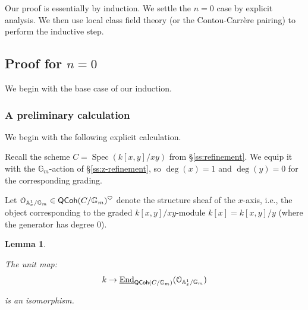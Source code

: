 \documentclass[reqno,11pt]{amsart}
\numberwithin{equation}{subsection}
\newtheorem{lem}[thm]{Lemma}
\theoremstyle{remark}
\newcommand{\bA}{{\mathbb A}}
\newcommand{\bG}{{\mathbb G}}
\newcommand{\sO}{{\EuScript O}}
\newcommand{\on}{\operatorname}
\newcommand{\ul}{\underline}
\newcommand{\End}{\on{End}}
\newcommand{\Spec}{\on{Spec}}
\newcommand{\heart}{\heartsuit}
\newcommand{\QCoh}{\mathsf{QCoh}}
\begin{document}
Our proof is essentially by induction. We settle the $n = 0$ case
by explicit analysis. We then use local class field theory
(or the Contou-Carr\`ere pairing) to perform the inductive step.

\subsection{Proof for $n = 0$}

We begin with the base case of our induction.

\subsubsection{A preliminary calculation}

We begin with the following explicit calculation.

Recall the scheme $C = \Spec(k[x,y]/xy)$ from \S \ref{ss:refinement}.
We equip it with the $\bG_m$-action of \S \ref{ss:z-refinement},
so $\deg(x) = 1$ and $\deg(y) = 0$ for the corresponding grading.

Let $\sO_{\bA_x^1/\bG_m} \in \QCoh(C/\bG_m)^{\heart}$ denote the structure
sheaf of the $x$-axis, i.e., the object corresponding to the graded
$k[x,y]/xy$-module $k[x] = k[x,y]/y$ (where the generator has degree $0$).

\begin{lem}\label{l:c-ext}

The unit map:
%
\[
k \to \ul{\End}_{\QCoh(C/\bG_m)}(\sO_{\bA_x^1/\bG_m})
\]

\noindent is an isomorphism.

\end{lem}
\end{document}
